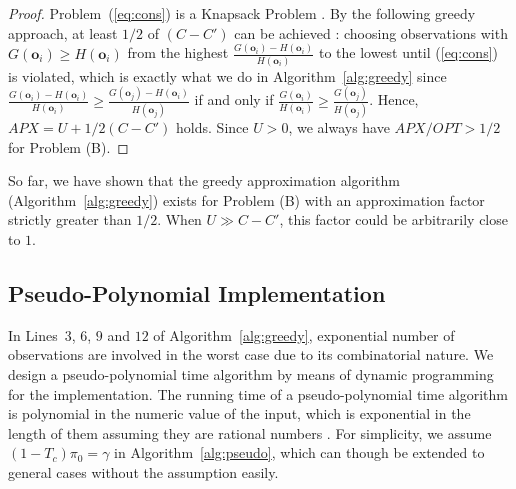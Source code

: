 \documentclass[conference]{IEEEtran}
\begin{document}
\begin{proof}
Problem~(\ref{eq:cons}) is a Knapsack Problem \cite{Vijay}. By the following greedy approach, at least $1/2$ of $(C-C')$ can be achieved \cite{Vijay}: choosing observations with $G({\boldsymbol{o}}_i)\ge H({\boldsymbol{o}}_i)$ from the highest $\frac{G({\boldsymbol{o}}_i)-H({\boldsymbol{o}}_i)}{H({\boldsymbol{o}}_i)}$ to the lowest until (\ref{eq:cons}) is violated, which is exactly what we do in Algorithm~\ref{alg:greedy} since $\frac{G({\boldsymbol{o}}_i)-H({\boldsymbol{o}}_i)}{H({\boldsymbol{o}}_i)}\ge \frac{G({\boldsymbol{o}}_j)-H({\boldsymbol{o}}_i)}{H({\boldsymbol{o}}_j)}$ if and only if $\frac{G({\boldsymbol{o}}_i)}{H({\boldsymbol{o}}_i)}\ge \frac{G({\boldsymbol{o}}_j)}{H({\boldsymbol{o}}_j)}$. Hence, $APX=U+1/2(C-C')$ holds. Since $U>0$, we always have $APX/OPT>1/2$ for Problem (B). 
\end{proof}

So far, we have shown that the greedy approximation algorithm (Algorithm~\ref{alg:greedy}) exists for Problem (B) with an approximation factor strictly greater than $1/2$. When $U\gg C-C'$, this factor could be arbitrarily close to $1$.

\subsection{Pseudo-Polynomial Implementation}
\label{subsec:comp}
In Lines~$3$, $6$, $9$ and $12$ of Algorithm~\ref{alg:greedy}, exponential number of observations are involved in the worst case due to its combinatorial nature. We design a pseudo-polynomial time algorithm by means of dynamic programming for the implementation. The running time of a pseudo-polynomial time algorithm is polynomial in the numeric value of the input, which is exponential in the length of them assuming they are rational numbers \cite{Vijay}. For simplicity, we assume $(1-T_c){\pi}_0=\gamma$ in Algorithm~\ref{alg:pseudo}, which can though be extended to general cases without the assumption easily.
\end{document}
